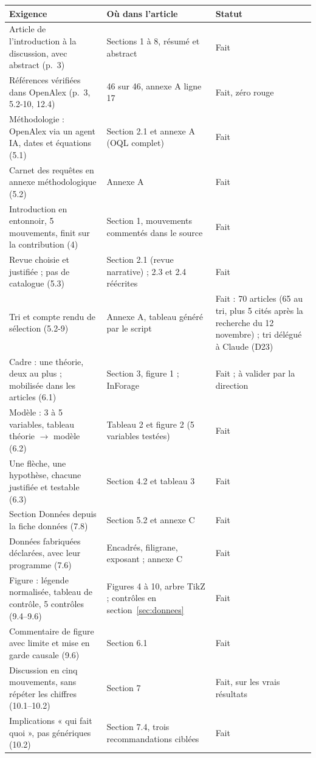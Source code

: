 \documentclass[10pt,a4paper]{article}
\begin{document}
\small
\begin{longtable}{@{}P{5.2cm}P{6.2cm}P{4.2cm}@{}}
\toprule
Exigence & Où dans l'article & Statut\\
\midrule\endhead
Article de l'introduction à la discussion, avec abstract (p.~3) & Sections 1 à 8, résumé et abstract & Fait\\
Références vérifiées dans OpenAlex (p.~3, 5.2-10, 12.4) & 46 sur 46, annexe A ligne 17 & Fait, zéro rouge\\
Méthodologie : OpenAlex via un agent IA, dates et équations (5.1) & Section 2.1 et annexe A (OQL complet) & Fait\\
Carnet des requêtes en annexe méthodologique (5.2) & Annexe A & Fait\\
Introduction en entonnoir, 5 mouvements, finit sur la contribution (4) & Section 1, mouvements commentés dans le source & Fait\\
Revue choisie et justifiée ; pas de catalogue (5.3) & Section 2.1 (revue narrative) ; 2.3 et 2.4 réécrites & Fait\\
Tri et compte rendu de sélection (5.2-9) & Annexe A, tableau généré par le script & Fait : 70 articles (65 au tri, plus 5 cités après la recherche du 12 novembre) ; tri délégué à Claude (D23)\\
Cadre : une théorie, deux au plus ; mobilisée dans les articles (6.1) & Section 3, figure 1 ; InForage & Fait ; à valider par la direction\\
Modèle : 3 à 5 variables, tableau théorie $\rightarrow$ modèle (6.2) & Tableau 2 et figure 2 (5 variables testées) & Fait\\
Une flèche, une hypothèse, chacune justifiée et testable (6.3) & Section 4.2 et tableau 3 & Fait\\
Section Données depuis la fiche données (7.8) & Section 5.2 et annexe C & Fait\\
Données fabriquées déclarées, avec leur programme (7.6) & Encadrés, filigrane, exposant ; annexe C & Fait\\
Figure : légende normalisée, tableau de contrôle, 5 contrôles (9.4--9.6) & Figures 4 à 10, arbre TikZ ; contrôles en section~\ref{sec:donnees} & Fait\\
Commentaire de figure avec limite et mise en garde causale (9.6) & Section 6.1 & Fait\\
Discussion en cinq mouvements, sans répéter les chiffres (10.1--10.2) & Section 7 & Fait, sur les vrais résultats\\
Implications « qui fait quoi », pas génériques (10.2) & Section 7.4, trois recommandations ciblées & Fait\\

\end{longtable}
\end{document}
